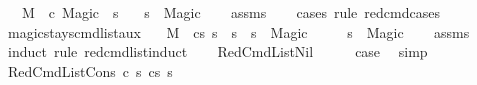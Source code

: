 \begin{isabellebody}
\ \ \ {\isachardoublequoteopen}M{\isacharcomma}{\kern0pt}{\isasymLambda}{\isacharcomma}{\kern0pt}{\isasymGamma}{\isacharcomma}{\kern0pt}{\isasymOmega}\ {\isasymturnstile}\ {\isasymlangle}c{\isacharcomma}{\kern0pt}\ Magic{\isasymrangle}\ {\isasymrightarrow}\ s{\isacharprime}{\kern0pt}{\isachardoublequoteclose}\isanewline
\ \ \ {\isachardoublequoteopen}s{\isacharprime}{\kern0pt}\ {\isacharequal}{\kern0pt}\ Magic{\isachardoublequoteclose}\isanewline
%
\isadelimproof
\ \ %
\endisadelimproof
%
\isatagproof
{}\isamarkupfalse%
\ assms\isanewline
\ \ \isamarkupfalse%
\ {\isacharparenleft}{\kern0pt}cases\ rule{\isacharcolon}{\kern0pt}\ red{\isacharunderscore}{\kern0pt}cmd{\isachardot}{\kern0pt}cases{\isacharparenright}{\kern0pt}%
\endisatagproof
{\isafoldproof}%
%
\isadelimproof
\isanewline
%
\endisadelimproof
\isanewline
{}\isamarkupfalse%
\ magic{\isacharunderscore}{\kern0pt}stays{\isacharunderscore}{\kern0pt}cmd{\isacharunderscore}{\kern0pt}list{\isacharunderscore}{\kern0pt}aux{\isacharcolon}{\kern0pt}\isanewline
\ \ \ {\isachardoublequoteopen}M{\isacharcomma}{\kern0pt}{\isasymLambda}{\isacharcomma}{\kern0pt}{\isasymGamma}{\isacharcomma}{\kern0pt}{\isasymOmega}\ {\isasymturnstile}\ {\isasymlangle}cs{\isacharcomma}{\kern0pt}\ s{\isasymrangle}\ {\isacharbrackleft}{\kern0pt}{\isasymrightarrow}{\isacharbrackright}{\kern0pt}\ s{\isacharprime}{\kern0pt}{\isachardoublequoteclose}\ \ {\isachardoublequoteopen}s\ {\isacharequal}{\kern0pt}\ Magic{\isachardoublequoteclose}\isanewline
\ \ \ \ \ {\isachardoublequoteopen}s{\isacharprime}{\kern0pt}\ {\isacharequal}{\kern0pt}\ Magic{\isachardoublequoteclose}\isanewline
%
\isadelimproof
\ \ %
\endisadelimproof
%
\isatagproof
{}\isamarkupfalse%
\ assms\isanewline
{}\isamarkupfalse%
\ {\isacharparenleft}{\kern0pt}induct\ rule{\isacharcolon}{\kern0pt}\ red{\isacharunderscore}{\kern0pt}cmd{\isacharunderscore}{\kern0pt}list{\isachardot}{\kern0pt}induct{\isacharparenright}{\kern0pt}\isanewline
\ \ \isamarkupfalse%
\ RedCmdListNil\isanewline
\ \ \isamarkupfalse%
\ \isamarkupfalse%
\ {\isacharquery}{\kern0pt}case\ \isamarkupfalse%
\ simp\isanewline
{}\isamarkupfalse%
\isanewline
\ \ \isamarkupfalse%
\ {\isacharparenleft}{\kern0pt}RedCmdListCons\ c\ s{\isacharprime}{\kern0pt}\ cs\ s{\isacharprime}{\kern0pt}{\isacharprime}{\kern0pt}{\isacharparenright}{\kern0pt}\isanewline

\end{isabellebody}
